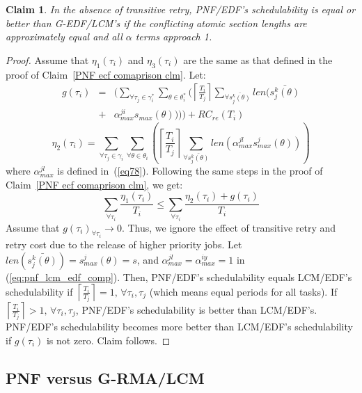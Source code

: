 \documentclass[a4paper,english]{article}
\newtheorem{clm}{Claim}
\newtheorem{proof}{Proof}
\begin{document}
\begin{clm}\label{sub:pnf_lcm_edf_comp}
In the absence of transitive retry, PNF/EDF's schedulability is equal or better than G-EDF/LCM's if the conflicting atomic section lengths are approximately equal and all $\alpha$ terms approach 1.

\end{clm}
\begin{proof}\normalfont
Assume that $\eta_{1}(\tau_i)$ and $\eta_{3}(\tau_i)$ are the same as that defined in the proof
of Claim~\ref{PNF ecf comaprison clm}. Let:
\begin{eqnarray*}
g(\tau_{i}) & = & \Bigg(\sum_{\forall\tau_{j}\in\gamma_{i}^{*}}\sum_{\theta\in\theta_{i}^{*}}\Bigg(\left\lceil \frac{T_{i}}{T_{j}}\right\rceil \sum_{\forall\bar{s_{j}^{k}(\theta)}}len\Big(\bar{s_{j}^{k}(\theta)}\\
 & + & \alpha_{max}^{ji}s_{max}(\theta)\Big)\Bigg)\Bigg)+RC_{re}(T_{i})
\end{eqnarray*}
\[
\eta_{2}(\tau_{i})=\sum_{\forall\tau_{j}\in\gamma_{i}}\sum_{\forall\theta\in\theta_{i}}\left(\left\lceil \frac{T_{i}}{T_{j}}\right\rceil \sum_{\forall\bar{s_{j}^{k}(\theta)}}len\left(\alpha_{max}^{jl}s_{max}^{j}(\theta)\right)\right)
\]
where $\alpha_{max}^{jl}$ is defined in~(\ref{eq78}). Following the same steps in the proof of Claim~\ref{PNF ecf comaprison clm}, we get:
\begin{equation}
\sum_{\forall\tau_{i}}\frac{\eta_{1}(\tau_{i})}{T_{i}}\le\sum_{\forall\tau_{i}}\frac{\eta_{2}(\tau_{i})+g(\tau_{i})}{T_{i}}\label{eq:pnf_lcm_edf_comp}
\end{equation}
Assume that $g(\tau_{i})_{\forall\tau_{i}}\rightarrow0$. Thus, we ignore the effect of transitive retry and retry cost due to the release of higher priority jobs. Let $len(\bar{s_{j}^{k}(\theta)})=s_{max}^{j}(\theta)=s$,
and $\alpha_{max}^{jl}=\alpha_{max}^{iy}=1$ in (\ref{eq:pnf_lcm_edf_comp}). Then, PNF/EDF's schedulability equals LCM/EDF's schedulability if
$\left\lceil \frac{T_{i}}{T_{j}}\right\rceil =1,\,\forall\tau_{i},\tau_{j}$
(which means equal periods for all tasks). If $\left\lceil \frac{T_{i}}{T_{j}}\right\rceil >1,\,\forall\tau_{i},\tau_{j}$,
PNF/EDF's schedulability is better than LCM/EDF's. PNF/EDF's schedulability  becomes more better than LCM/EDF's schedulability if $g(\tau_{i})$
is not zero. Claim follows.
\end{proof}

\subsection{PNF versus G-RMA/LCM}
\end{document}
